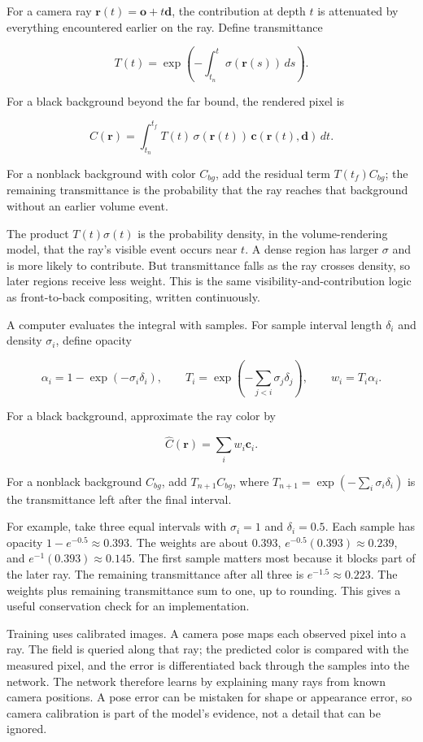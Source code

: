 For a camera ray \(\mathbf{r}(t)=\mathbf{o}+t\mathbf{d}\), the contribution at depth \(t\) is attenuated by everything encountered earlier on the ray. Define transmittance

\[T(t)=\exp\left(-\int_{t_n}^{t}\sigma(\mathbf{r}(s))\,ds\right).\]

For a black background beyond the far bound, the rendered pixel is

\[C(\mathbf{r})=\int_{t_n}^{t_f}T(t)\,\sigma(\mathbf{r}(t))\,\mathbf{c}(\mathbf{r}(t),\mathbf{d})\,dt.\]

For a nonblack background with color \(C_{bg}\), add the residual term \(T(t_f)C_{bg}\); the remaining transmittance is the probability that the ray reaches that background without an earlier volume event.

The product \(T(t)\sigma(t)\) is the probability density, in the volume-rendering model, that the ray's visible event occurs near \(t\). A dense region has larger \(\sigma\) and is more likely to contribute. But transmittance falls as the ray crosses density, so later regions receive less weight. This is the same visibility-and-contribution logic as front-to-back compositing, written continuously.

A computer evaluates the integral with samples. For sample interval length \(\delta_i\) and density \(\sigma_i\), define opacity

\[\alpha_i=1-\exp(-\sigma_i\delta_i),\qquad T_i=\exp\left(-\sum_{j<i}\sigma_j\delta_j\right),\qquad w_i=T_i\alpha_i.\]

For a black background, approximate the ray color by

\[\widehat C(\mathbf{r})=\sum_i w_i\mathbf{c}_i.\]

For a nonblack background \(C_{bg}\), add \(T_{n+1}C_{bg}\), where \(T_{n+1}=\exp(-\sum_i\sigma_i\delta_i)\) is the transmittance left after the final interval.

For example, take three equal intervals with \(\sigma_i=1\) and \(\delta_i=0.5\). Each sample has opacity \(1-e^{-0.5}\approx0.393\). The weights are about \(0.393\), \(e^{-0.5}(0.393)\approx0.239\), and \(e^{-1}(0.393)\approx0.145\). The first sample matters most because it blocks part of the later ray. The remaining transmittance after all three is \(e^{-1.5}\approx0.223\). The weights plus remaining transmittance sum to one, up to rounding. This gives a useful conservation check for an implementation.

Training uses calibrated images. A camera pose maps each observed pixel into a ray. The field is queried along that ray; the predicted color is compared with the measured pixel, and the error is differentiated back through the samples into the network. The network therefore learns by explaining many rays from known camera positions. A pose error can be mistaken for shape or appearance error, so camera calibration is part of the model's evidence, not a detail that can be ignored.

